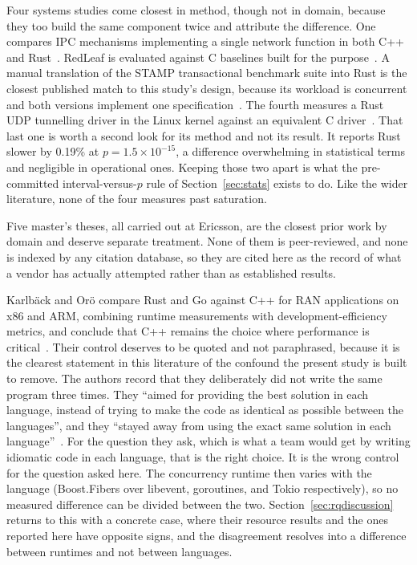 \documentclass[english,oneside,a4paper,censored,csm,software-track-2020]{HYthesisML}
\begin{document}
Four systems studies come closest in method, though not in domain, because they too build the
same component twice and attribute the difference. One compares IPC mechanisms implementing a
single network function in both C++ and Rust~\cite{li2021ipc}. RedLeaf is evaluated against C
baselines built for the purpose~\cite{narayanan2020redleaf}. A manual translation of the STAMP
transactional benchmark suite into Rust is the closest published match to this study's design,
because its workload is concurrent and both versions implement one
specification~\cite{suchert2023stamp}. The fourth measures a Rust UDP tunnelling driver in the
Linux kernel against an equivalent C driver~\cite{gonzalez2023rustudp}. That last one is worth a
second look for its method and not its result. It reports Rust slower by 0.19\% at
$p = 1.5 \times 10^{-15}$, a difference overwhelming in statistical terms and negligible in
operational ones. Keeping those two apart is what the pre-committed interval-versus-$p$ rule of
Section~\ref{sec:stats} exists to do. Like the wider literature, none of the four measures past
saturation.

Five master's theses, all carried out at Ericsson, are the closest prior work by domain and
deserve separate treatment. None of them is peer-reviewed, and none is indexed by any citation
database, so they are cited here as the record of what a vendor has actually attempted rather
than as established results.

Karlb\"ack and Or\"o compare Rust and Go against C++ for RAN applications on x86 and ARM,
combining runtime measurements with development-efficiency metrics, and conclude that C++ remains
the choice where performance is critical~\cite{karlback2021ran}. Their control deserves to be
quoted and not paraphrased, because it is the clearest statement in this literature of the
confound the present study is built to remove. The authors record that they deliberately did not
write the same program three times. They ``aimed for providing the best solution in each language,
instead of trying to make the code as identical as possible between the languages'', and they
``stayed away from using the exact same solution in each
language''~\cite{karlback2021ran}. For the question they ask, which is what a team would
get by writing idiomatic code in each language, that is the right choice. It is the wrong
control for the question asked here. The concurrency runtime then varies with the language
(Boost.Fibers over libevent, goroutines, and Tokio respectively), so no measured difference can
be divided between the two. Section~\ref{sec:rqdiscussion} returns to this with a concrete
case, where their resource results and the ones reported here have opposite signs, and the
disagreement resolves into a difference between runtimes and not between languages.
\end{document}
